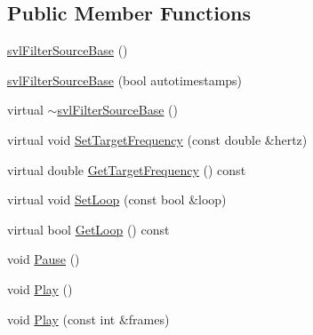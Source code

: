 \subsection*{Public Member Functions}
\begin{DoxyCompactItemize}
\item 
\hyperlink{classsvl_filter_source_base_a35532f5df7d55568fa65bb2fd9c680e6}{svl\+Filter\+Source\+Base} ()
\item 
\hyperlink{classsvl_filter_source_base_a7348ada5c7c667d1a7548a65952f7db7}{svl\+Filter\+Source\+Base} (bool autotimestamps)
\item 
virtual \hyperlink{classsvl_filter_source_base_a321b737538c8881c24804a0b115333c8}{$\sim$svl\+Filter\+Source\+Base} ()
\item 
virtual void \hyperlink{classsvl_filter_source_base_afa3df2b062e408bcc91789986cb8e7be}{Set\+Target\+Frequency} (const double \&hertz)
\item 
virtual double \hyperlink{classsvl_filter_source_base_a5b5d1b96c248afc1d5ecc099b879e0c5}{Get\+Target\+Frequency} () const 
\item 
virtual void \hyperlink{classsvl_filter_source_base_a982e352327cb6be4e2d8eaa6d07a9521}{Set\+Loop} (const bool \&loop)
\item 
virtual bool \hyperlink{classsvl_filter_source_base_a32e21fc646531ce72b2fc02f6a33fb1a}{Get\+Loop} () const 
\item 
void \hyperlink{classsvl_filter_source_base_a821a6fce53b224e63b1e534a5ffcbee1}{Pause} ()
\item 
void \hyperlink{classsvl_filter_source_base_affb82ef0a14ae22a802fe1450ab46314}{Play} ()
\item 
void \hyperlink{classsvl_filter_source_base_a1cbaa1f9e3156b5c7976d460f24178ef}{Play} (const int \&frames)
\end{DoxyCompactItemize}
